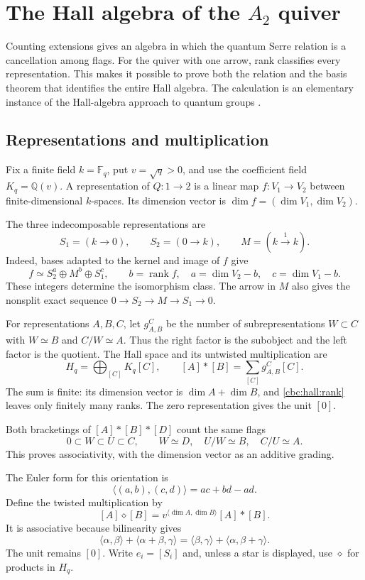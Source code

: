 \chapter{The Hall algebra of the \texorpdfstring{$A_2$}{A2} quiver}\label{cbc:hall:main}
Counting extensions gives an algebra in which the quantum Serre relation is a
cancellation among flags.  For the quiver with one arrow, rank classifies every
representation.  This makes it possible to prove both the relation and the
basis theorem that identifies the entire Hall algebra.  The calculation is an
elementary instance of the Hall-algebra approach to quantum groups
\cite{Ringel,Green}.

\section{Representations and multiplication}
Fix a finite field $k=\mathbb F_q$, put $v=\sqrt q>0$, and use the coefficient
field $K_q=\mathbb Q(v)$.  A representation of $Q:1\to2$ is a linear map
$f:V_1\to V_2$ between finite-dimensional $k$-spaces.  Its dimension vector is
$\dim f=(\dim V_1,\dim V_2)$.

The three indecomposable representations are
\[
 S_1=(k\to0),\qquad S_2=(0\to k),\qquad M=(k\xrightarrow{1}k).
\]
Indeed, bases adapted to the kernel and image of $f$ give
\begin{equation}\label{cbc:hall:rank}
 f\simeq S_2^a\oplus M^b\oplus S_1^c,
 \qquad b=\operatorname{rank}f,\quad
 a=\dim V_2-b,\quad c=\dim V_1-b.
\end{equation}
These integers determine the isomorphism class.  The arrow in $M$ also gives
the nonsplit exact sequence $0\to S_2\to M\to S_1\to0$.

For representations $A,B,C$, let $g_{A,B}^C$ be the number of subrepresentations
$W\subset C$ with $W\simeq B$ and $C/W\simeq A$.  Thus the right factor is the
subobject and the left factor is the quotient.  The Hall space and its
untwisted multiplication are
\[
 H_q=\bigoplus_{[C]}K_q[C],\qquad
 [A]*[B]=\sum_{[C]}g_{A,B}^C[C].
\]
The sum is finite: its dimension vector is $\dim A+\dim B$, and
\eqref{cbc:hall:rank} leaves only finitely many ranks.  The zero representation
gives the unit $[0]$.

Both bracketings of $[A]*[B]*[D]$ count the same flags
\[
 0\subset W\subset U\subset C,
 \qquad W\simeq D,\quad U/W\simeq B,\quad C/U\simeq A.
\]
This proves associativity, with the dimension vector as an additive grading.

The Euler form for this orientation is
\[
 \langle(a,b),(c,d)\rangle=ac+bd-ad.
\]
Define the twisted multiplication by
\begin{equation}\label{cbc:hall:twist}
 [A]\diamond[B]=v^{\langle\dim A,\dim B\rangle}[A]*[B].
\end{equation}
It is associative because bilinearity gives
\[
 \langle\alpha,\beta\rangle+\langle\alpha+\beta,\gamma\rangle
 =\langle\beta,\gamma\rangle+\langle\alpha,\beta+\gamma\rangle.
\]
The unit remains $[0]$.  Write $e_i=[S_i]$ and, unless a star is displayed,
use $\diamond$ for products in $H_q$.

